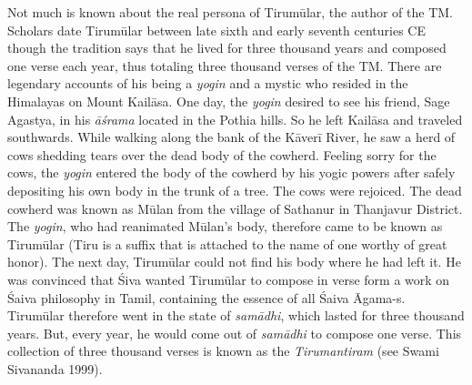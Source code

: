 Not much is known about the real persona of Tirumūlar, the author of the TM. Scholars date Tirumūlar between late sixth and early seventh centuries CE though the tradition says that he lived for three thousand years and composed one verse each year, thus totaling three thousand verses of the TM. There are legendary accounts of his being a \textit{yogin} and a mystic who resided in the Himalayas on Mount Kailāsa. One day, the \textit{yogin} desired to see his friend, Sage Agastya, in his \textit{āśrama} located in the Pothia hills. So he left Kailāsa and traveled southwards. While walking along the bank of the Kāverī River, he saw a herd of cows shedding tears over the dead body of the cowherd. Feeling sorry for the cows, the \textit{yogin} entered the body of the cowherd by his yogic powers after safely depositing his own body in the trunk of a tree. The cows were rejoiced. The dead cowherd was known as Mūlan from the village of Sathanur in Thanjavur District. The \textit{yogin}, who had reanimated Mūlan’s body, therefore came to be known as Tirumūlar (Tiru is a suffix that is attached to the name of one worthy of great honor). The next day, Tirumūlar could not find his body where he had left it. He was convinced that Śiva wanted Tirumūlar to compose in verse form a work on Śaiva philosophy in Tamil, containing the essence of all Śaiva Āgama-s. Tirumūlar therefore went in the state of \textit{samādhi}, which lasted for three thousand years. But, every year, he would come out of \textit{samādhi} to compose one verse. This collection of three thousand verses is known as the \textit{Tirumantiram} (see Swami Sivananda 1999).

